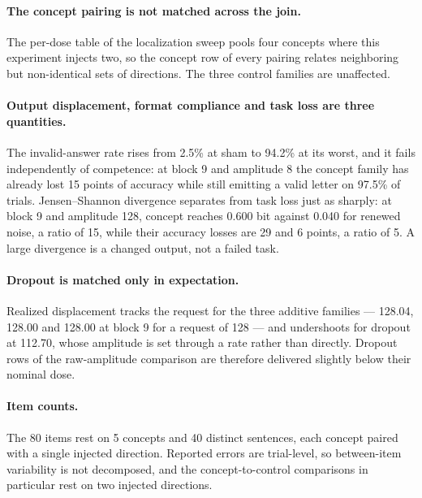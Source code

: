 \paragraph{The concept pairing is not matched across the join.}
The per-dose table of the localization sweep pools four concepts where this experiment injects two, so the concept row of every pairing relates neighboring but non-identical sets of directions.
The three control families are unaffected.

\paragraph{Output displacement, format compliance and task loss are three quantities.}
The invalid-answer rate rises from 2.5\% at sham to 94.2\% at its worst, and it fails independently of competence: at block 9 and amplitude 8 the concept family has already lost 15 points of accuracy while still emitting a valid letter on 97.5\% of trials.
Jensen--Shannon divergence separates from task loss just as sharply: at block 9 and amplitude 128, concept reaches 0.600 bit against 0.040 for renewed noise, a ratio of 15, while their accuracy losses are 29 and 6 points, a ratio of 5.
A large divergence is a changed output, not a failed task.

\paragraph{Dropout is matched only in expectation.}
Realized displacement tracks the request for the three additive families --- 128.04, 128.00 and 128.00 at block 9 for a request of 128 --- and undershoots for dropout at 112.70, whose amplitude is set through a rate rather than directly.
Dropout rows of the raw-amplitude comparison are therefore delivered slightly below their nominal dose.

\paragraph{Item counts.}
The 80 items rest on 5 concepts and 40 distinct sentences, each concept paired with a single injected direction.
Reported errors are trial-level, so between-item variability is not decomposed, and the concept-to-control comparisons in particular rest on two injected directions.

